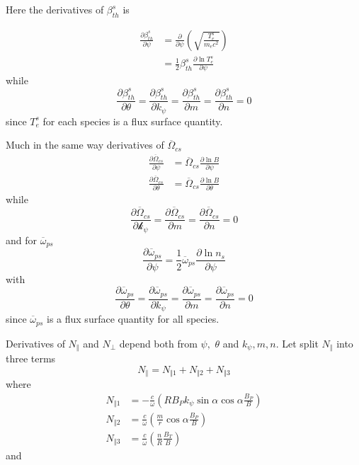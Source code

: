 \documentclass[a4paper,12pt]{article}%
\begin{document}
Here the derivatives of $\beta_{th}^{s}$ is%

\begin{align}
\frac{\partial\beta_{th}^{s}}{\mathcal{\partial}\psi}  &  =\frac{\partial
}{\mathcal{\partial}\psi}\left(  \sqrt{\frac{T_{e}^{s}}{m_{e}c^{2}}}\right)
\nonumber\\
&  =\frac{1}{2}\beta_{th}^{s}\frac{\partial\ln T_{e}^{s}}{\mathcal{\partial
}\psi}%
\end{align}
while%
\begin{equation}
\frac{\partial\beta_{th}^{s}}{\mathcal{\partial}\theta}=\frac{\partial
\beta_{th}^{s}}{\mathcal{\partial}k_{\psi}}=\frac{\partial\beta_{th}^{s}%
}{\mathcal{\partial}m}=\frac{\partial\beta_{th}^{s}}{\mathcal{\partial}n}=0
\end{equation}
since $T_{e}^{s}$ for each species is a flux surface quantity.

Much in the same way derivatives of $\overline{\Omega}_{cs}$
\begin{align}
\frac{\partial\overline{\Omega}_{cs}}{\mathcal{\partial}\psi}  &
=\overline{\Omega}_{cs}\frac{\partial\ln B}{\mathcal{\partial}\psi}\\
\frac{\partial\overline{\Omega}_{cs}}{\mathcal{\partial}\theta}  &
=\overline{\Omega}_{cs}\frac{\partial\ln B}{\mathcal{\partial}\theta}%
\end{align}
while
\begin{equation}
\frac{\partial\overline{\Omega}_{cs}}{\mathcal{\partial k}_{\psi}}%
=\frac{\partial\overline{\Omega}_{cs}}{\mathcal{\partial}m}=\frac
{\partial\overline{\Omega}_{cs}}{\mathcal{\partial}n}=0
\end{equation}
and for $\overline{\omega}_{ps}$
\begin{equation}
\frac{\partial\overline{\omega}_{ps}}{\mathcal{\partial}\psi}=\frac{1}%
{2}\overline{\omega}_{ps}\frac{\partial\ln n_{s}}{\mathcal{\partial}\psi}%
\end{equation}
with%
\begin{equation}
\frac{\partial\overline{\omega}_{ps}}{\mathcal{\partial}\theta}=\frac
{\partial\overline{\omega}_{ps}}{\mathcal{\partial}k_{\psi}}=\frac
{\partial\overline{\omega}_{ps}}{\mathcal{\partial}m}=\frac{\partial
\overline{\omega}_{ps}}{\mathcal{\partial}n}=0
\end{equation}
since $\overline{\omega}_{ps}$ is a flux surface quantity for all species.

Derivatives of $N_{\Vert}$ and $N_{\bot}$ depend both from $\psi,$ $\theta$
and $k_{\psi},m,n.$ Let split $N_{\Vert}$ into three terms%
\begin{equation}
N_{\Vert}=N_{\Vert1}+N_{\Vert2}+N_{\Vert3}%
\end{equation}
where%
\begin{align}
N_{\Vert1}  &  =-\frac{c}{\omega}\left(  RB_{P}k_{\psi}\sin\alpha\cos
\alpha\frac{B_{P}}{B}\right) \\
N_{\Vert2}  &  =\frac{c}{\omega}\left(  \frac{m}{r}\cos\alpha\frac{B_{P}}%
{B}\right) \\
N_{\Vert3}  &  =\frac{c}{\omega}\left(  \frac{n}{R}\frac{B_{T}}{B}\right)
\end{align}
and%
\end{document}

